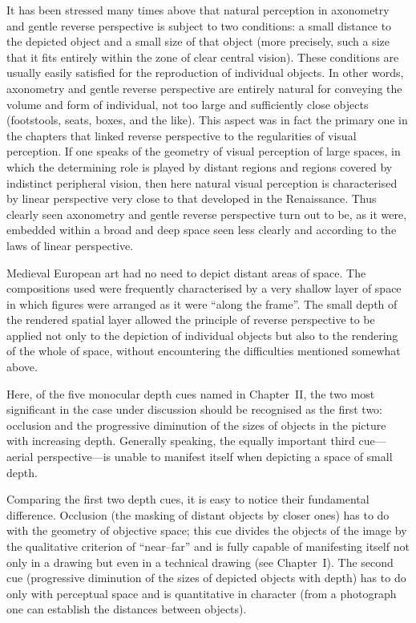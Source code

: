 It has been stressed many times above that natural perception in axonometry and
gentle reverse perspective is subject to two conditions: a small distance to the
depicted object and a small size of that object (more precisely, such a size that it
fits entirely within the zone of clear central vision). These conditions are usually
easily satisfied for the reproduction of individual objects. In other words,
axonometry and gentle reverse perspective are entirely natural for conveying the
volume and form of individual, not too large and sufficiently close objects
(footstools, seats, boxes, and the like). This aspect was in fact the primary one in
the chapters that linked reverse perspective to the regularities of visual
perception. If one speaks of the geometry of visual perception of large spaces, in
which the determining role is played by distant regions and regions covered by
indistinct peripheral vision, then here natural visual perception is characterised
by linear perspective very close to that developed in the Renaissance. Thus clearly
seen axonometry and gentle reverse perspective turn out to be, as it were, embedded
within a broad and deep space seen less clearly and according to the laws of linear
perspective.


Medieval European art had no need to depict distant areas of space. The
compositions used were frequently characterised by a very shallow layer of space in
which figures were arranged as it were ``along the frame''. The small depth of the
rendered spatial layer allowed the principle of reverse perspective to be applied
not only to the depiction of individual objects but also to the rendering of the
whole of space, without encountering the difficulties mentioned somewhat above.

Here, of the five monocular depth cues named in Chapter~II, the two most
significant in the case under discussion should be recognised as the first two:
occlusion and the progressive diminution of the sizes of objects in the picture with
increasing depth. Generally speaking, the equally important third cue---aerial
perspective---is unable to manifest itself when depicting a space of small depth.

Comparing the first two depth cues, it is easy to notice their fundamental
difference. Occlusion (the masking of distant objects by closer ones) has to do with
the geometry of objective space; this cue divides the objects of the image by the
qualitative criterion of ``near--far'' and is fully capable of manifesting itself
not only in a drawing but even in a technical drawing (see Chapter~I). The second
cue (progressive diminution of the sizes of depicted objects with depth) has to do
only with perceptual space and is quantitative in character (from a photograph one
can establish the distances between objects).

